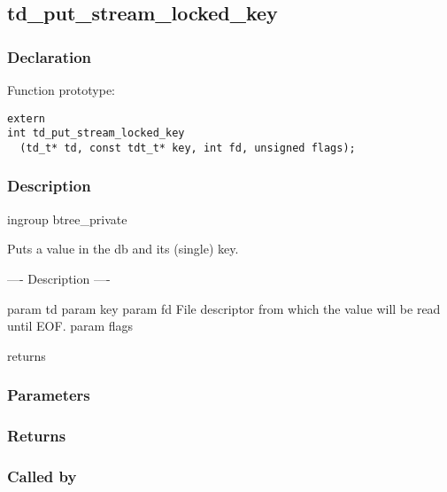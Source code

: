 
\newpage
\subsection{td\_put\_stream\_locked\_key}
\subsubsection{Declaration} Function prototype:

\begin{verbatim}
extern
int td_put_stream_locked_key
  (td_t* td, const tdt_t* key, int fd, unsigned flags);
\end{verbatim}

\subsubsection{Description}


 ingroup btree\_private

 Puts a value in the db and its (single) key.
 
 ---- Description ----

 param td
 param key
 param fd File descriptor from which the value will be read until EOF.
 param flags

 returns
 

\subsubsection{Parameters}
\subsubsection{Returns}
\subsubsection{Called by}
